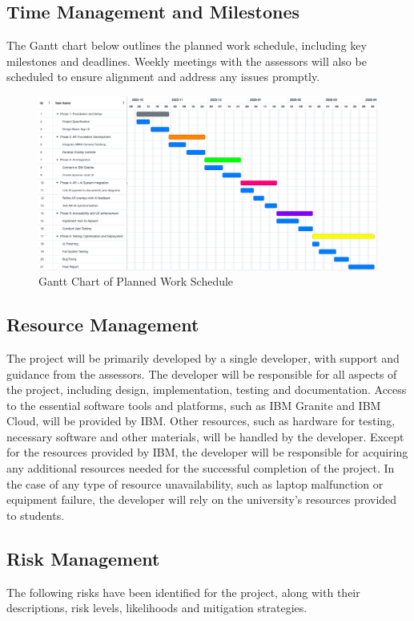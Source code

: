 \documentclass[12pt]{article}
\begin{document}
    \subsection{Time Management and Milestones}
        The Gantt chart below outlines the planned work schedule, including key milestones and deadlines. Weekly meetings with the assessors will also be scheduled to ensure alignment and address any issues promptly.

        \begin{figure}[H]
        \centering
        \includegraphics[width=\textwidth]{GanttChart.png}
        \caption{Gantt Chart of Planned Work Schedule}
        \label{fig:GanttChart}
        \end{figure}

    \subsection{Resource Management}

    The project will be primarily developed by a single developer, with support and guidance from the assessors. The developer will be responsible for all aspects of the project, including design, implementation, testing and documentation.
    Access to the essential software tools and platforms, such as IBM Granite and IBM Cloud, will be provided by IBM. Other resources, such as hardware for testing, necessary software and other materials, will be handled by the developer. Except for the
    resources provided by IBM, the developer will be responsible for acquiring any additional resources needed for the successful completion of the project. In the case of any type of resource unavailability, such as laptop malfunction or equipment failure, the
    developer will rely on the university's resources provided to students.


    \subsection{Risk Management}
    The following risks have been identified for the project, along with their descriptions, risk levels, likelihoods and mitigation strategies.
\end{document}
